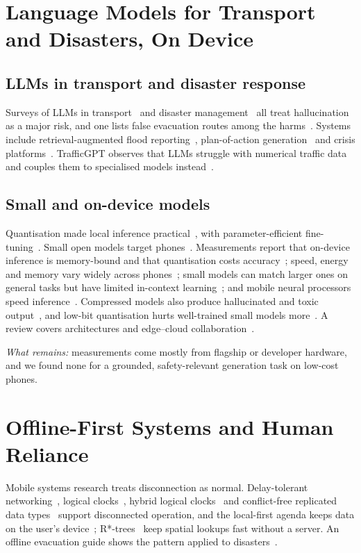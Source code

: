 \documentclass[journal]{IEEEtran}
\begin{document}
\section{Language Models for Transport and Disasters, On Device}\label{sec:edge}
\subsection{LLMs in transport and disaster response}
Surveys of LLMs in transport~\cite{wandelt2024its,nie2025llm4tr,yan2025llmtransport,zhang2024mobilityllm} and disaster management~\cite{lei2025disaster,xu2025disasterreview,zhu2025urbandisaster} all treat hallucination as a major risk, and one lists false evacuation routes among the harms~\cite{lei2025disaster}. Systems include retrieval-augmented flood reporting~\cite{colverd2023floodbrain}, plan-of-action generation~\cite{goecks2023disastergpt} and crisis platforms~\cite{otal2024crisis}. TrafficGPT observes that LLMs struggle with numerical traffic data and couples them to specialised models instead~\cite{zhang2024trafficgpt}.

\subsection{Small and on-device models}
Quantisation made local inference practical~\cite{jacob2018quantization,dettmers2022int8,frantar2023gptq,lin2024awq}, with parameter-efficient fine-tuning~\cite{hu2022lora,dettmers2023qlora}. Small open models target phones~\cite{gemma2024gemma,gemma2025gemma3,abdin2024phi3,liu2024mobilellm,allal2025smollm2}. Measurements report that on-device inference is memory-bound and that quantisation costs accuracy~\cite{laskaridis2024melt}; speed, energy and memory vary widely across phones~\cite{xiao2024pockets,li2024palmbench,murthy2024mobileaibench}; small models can match larger ones on general tasks but have limited in-context learning~\cite{lu2025demystifying,lu2024slmsurvey}; and mobile neural processors speed inference~\cite{xu2025llmnpu}. Compressed models also produce hallucinated and toxic output~\cite{li2024palmbench}, and low-bit quantisation hurts well-trained small models more~\cite{ouyang2024lowbit}. A review covers architectures and edge--cloud collaboration~\cite{xu2024ondevice}.

\emph{What remains:} measurements come mostly from flagship or developer hardware, and we found none for a grounded, safety-relevant generation task on low-cost phones.

\section{Offline-First Systems and Human Reliance}\label{sec:offline}
Mobile systems research treats disconnection as normal. Delay-tolerant networking~\cite{fall2003dtn}, logical clocks~\cite{lamport1978time}, hybrid logical clocks~\cite{kulkarni2014hlc} and conflict-free replicated data types~\cite{shapiro2011crdt} support disconnected operation, and the local-first agenda keeps data on the user's device~\cite{kleppmann2019localfirst}; R*-trees~\cite{beckmann1990rstar} keep spatial lookups fast without a server. An offline evacuation guide shows the pattern applied to disasters~\cite{itoi2017offline}.
\end{document}
